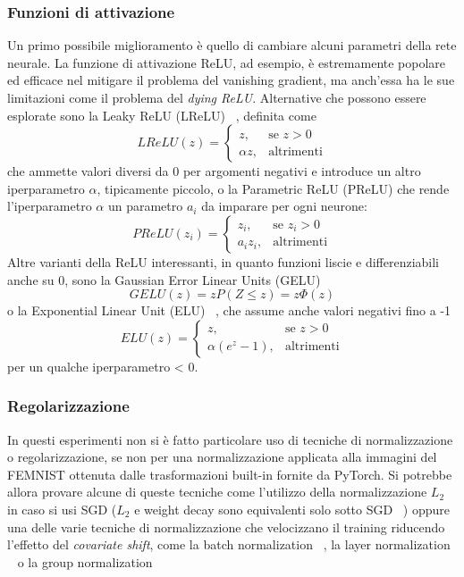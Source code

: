 \subsubsection{Funzioni di attivazione}
Un primo possibile miglioramento 
è quello di cambiare alcuni parametri 
della rete neurale.
La funzione di attivazione ReLU, ad esempio, è 
estremamente popolare ed efficace nel mitigare il problema del 
vanishing gradient, ma anch'essa ha le sue limitazioni come il 
problema del \textit{dying ReLU}. Alternative che possono essere 
esplorate sono la Leaky ReLU (LReLU) ~\cite{Maas2013RectifierNI},
definita come
\[
LReLU(z) = 
\begin{cases} 
      z, & \text{se } z > 0 \\
      \alpha z, & \text{altrimenti}
\end{cases}
\]
che ammette valori diversi da 0 per argomenti negativi e introduce un 
altro iperparametro \(\alpha\), tipicamente piccolo,
o la Parametric ReLU (PReLU) che rende l'iperparametro \(\alpha\)
un parametro \(a_i\) da imparare per ogni neurone:
\[
PReLU(z_i) = 
\begin{cases} 
      z_i, & \text{se } z_i > 0 \\
      a_i z_i, & \text{altrimenti}
\end{cases}
\]
Altre varianti della ReLU interessanti, in quanto funzioni liscie e 
differenziabili anche su 0, sono la Gaussian Error Linear Units (GELU)
~\cite{hendrycks2016gelu}
\[
GELU(z) = z P(Z \le z) = z \Phi(z)
\]
o la Exponential Linear Unit (ELU) ~\cite{clevert2016elu}, 
che assume anche valori negativi fino a -1
\[
ELU(z) = 
\begin{cases} 
      z, & \text{se } z > 0 \\
      \alpha (e^z - 1), & \text{altrimenti}
\end{cases}
\]
per un qualche iperparametro \alpha < 0.


\subsubsection{Regolarizzazione}
In questi esperimenti non si è fatto particolare uso di tecniche di 
normalizzazione o regolarizzazione, se non per una normalizzazione 
applicata alla immagini del FEMNIST ottenuta dalle trasformazioni 
built-in fornite da PyTorch. Si potrebbe allora provare alcune di 
queste tecniche come l'utilizzo della normalizzazione \(L_2\) in caso si 
usi SGD (\(L_2\) e weight decay sono equivalenti solo sotto SGD 
~\cite{Loshchilov2017AdamW}) oppure una delle varie tecniche di 
normalizzazione che velocizzano il training riducendo l'effetto del 
\textit{covariate shift}, come la batch normalization ~\cite{ioffe2015batch},
la layer normalization ~\cite{ba2016layer} o la group normalization 
~\cite{wu2018group}


